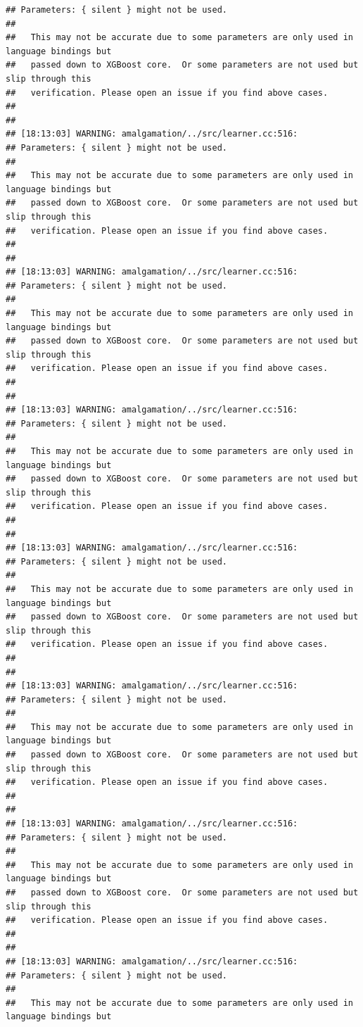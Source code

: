 \documentclass[AMS,STIX2COL]{WileyNJD-v2}\usepackage[]{graphicx}\usepackage[]{color}
\makeatletter
\newenvironment{kframe}{%
 \def\at@end@of@kframe{}%
 \ifinner\ifhmode%
  \def\at@end@of@kframe{\end{minipage}}%
  \begin{minipage}{\columnwidth}%
 \fi\fi%
 \def\FrameCommand##1{\hskip\@totalleftmargin \hskip-\fboxsep
 \colorbox{shadecolor}{##1}\hskip-\fboxsep
     \hskip-\linewidth \hskip-\@totalleftmargin \hskip\columnwidth}%
 \MakeFramed {\advance\hsize-\width
   \@totalleftmargin\z@ \linewidth\hsize
   \@setminipage}}%
 {\par\unskip\endMakeFramed%
 \at@end@of@kframe}
\newenvironment{knitrout}{}{} %
\makeatother
\begin{document}
\begin{knitrout}
\begin{kframe}
\begin{verbatim}
## Parameters: { silent } might not be used.
## 
##   This may not be accurate due to some parameters are only used in language bindings but
##   passed down to XGBoost core.  Or some parameters are not used but slip through this
##   verification. Please open an issue if you find above cases.
## 
## 
## [18:13:03] WARNING: amalgamation/../src/learner.cc:516: 
## Parameters: { silent } might not be used.
## 
##   This may not be accurate due to some parameters are only used in language bindings but
##   passed down to XGBoost core.  Or some parameters are not used but slip through this
##   verification. Please open an issue if you find above cases.
## 
## 
## [18:13:03] WARNING: amalgamation/../src/learner.cc:516: 
## Parameters: { silent } might not be used.
## 
##   This may not be accurate due to some parameters are only used in language bindings but
##   passed down to XGBoost core.  Or some parameters are not used but slip through this
##   verification. Please open an issue if you find above cases.
## 
## 
## [18:13:03] WARNING: amalgamation/../src/learner.cc:516: 
## Parameters: { silent } might not be used.
## 
##   This may not be accurate due to some parameters are only used in language bindings but
##   passed down to XGBoost core.  Or some parameters are not used but slip through this
##   verification. Please open an issue if you find above cases.
## 
## 
## [18:13:03] WARNING: amalgamation/../src/learner.cc:516: 
## Parameters: { silent } might not be used.
## 
##   This may not be accurate due to some parameters are only used in language bindings but
##   passed down to XGBoost core.  Or some parameters are not used but slip through this
##   verification. Please open an issue if you find above cases.
## 
## 
## [18:13:03] WARNING: amalgamation/../src/learner.cc:516: 
## Parameters: { silent } might not be used.
## 
##   This may not be accurate due to some parameters are only used in language bindings but
##   passed down to XGBoost core.  Or some parameters are not used but slip through this
##   verification. Please open an issue if you find above cases.
## 
## 
## [18:13:03] WARNING: amalgamation/../src/learner.cc:516: 
## Parameters: { silent } might not be used.
## 
##   This may not be accurate due to some parameters are only used in language bindings but
##   passed down to XGBoost core.  Or some parameters are not used but slip through this
##   verification. Please open an issue if you find above cases.
## 
## 
## [18:13:03] WARNING: amalgamation/../src/learner.cc:516: 
## Parameters: { silent } might not be used.
## 
##   This may not be accurate due to some parameters are only used in language bindings but

\end{verbatim}
\end{kframe}
\end{knitrout}
\end{document}
